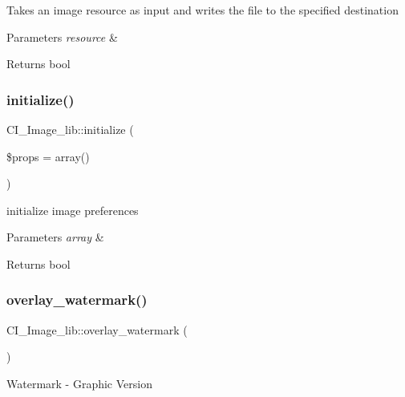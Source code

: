 Takes an image resource as input and writes the file to the specified destination


\begin{DoxyParams}{Parameters}
{\em resource} & \\
\hline
\end{DoxyParams}
\begin{DoxyReturn}{Returns}
bool 
\end{DoxyReturn}
\mbox{\label{class_c_i___image__lib_afc268412985af38c15ef7cebcb168b1c}} 
\subsubsection{\texorpdfstring{initialize()}{initialize()}}
{\footnotesize\ttfamily C\+I\+\_\+\+Image\+\_\+lib\+::initialize (\begin{DoxyParamCaption}\item[{}]{\$props = {\ttfamily array()} }\end{DoxyParamCaption})}

initialize image preferences


\begin{DoxyParams}{Parameters}
{\em array} & \\
\hline
\end{DoxyParams}
\begin{DoxyReturn}{Returns}
bool 
\end{DoxyReturn}
\mbox{\label{class_c_i___image__lib_a431670b93295e97de3decc52d92b0faa}} 
\subsubsection{\texorpdfstring{overlay\+\_\+watermark()}{overlay\_watermark()}}
{\footnotesize\ttfamily C\+I\+\_\+\+Image\+\_\+lib\+::overlay\+\_\+watermark (\begin{DoxyParamCaption}{ }\end{DoxyParamCaption})}

Watermark -\/ Graphic Version

